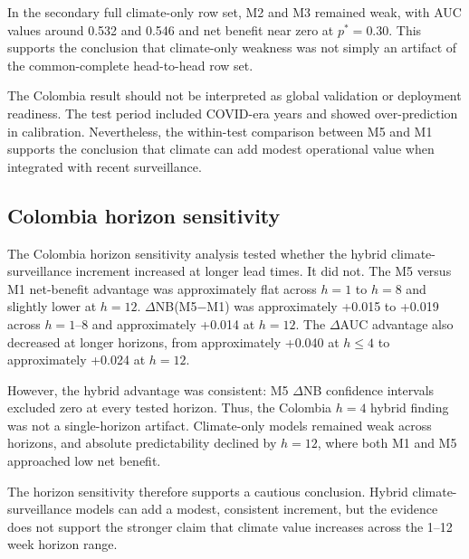\documentclass[11pt,a4paper]{article}
\begin{document}
In the secondary full climate-only row set, M2 and M3 remained weak, with AUC values around 0.532 and 0.546 and net benefit near zero at $p^*=0.30$. This supports the conclusion that climate-only weakness was not simply an artifact of the common-complete head-to-head row set.

The Colombia result should not be interpreted as global validation or deployment readiness. The test period included COVID-era years and showed over-prediction in calibration. Nevertheless, the within-test comparison between M5 and M1 supports the conclusion that climate can add modest operational value when integrated with recent surveillance.


\subsection{Colombia horizon sensitivity}
\label{subsec:colombia-horizon}

The Colombia horizon sensitivity analysis tested whether the hybrid climate-surveillance increment increased at longer lead times. It did not. The M5 versus M1 net-benefit advantage was approximately flat across $h=1$ to $h=8$ and slightly lower at $h=12$. $\Delta$NB(M5$-$M1) was approximately +0.015 to +0.019 across $h=1$--8 and approximately +0.014 at $h=12$. The $\Delta$AUC advantage also decreased at longer horizons, from approximately +0.040 at $h \leq 4$ to approximately +0.024 at $h=12$.

However, the hybrid advantage was consistent: M5 $\Delta$NB confidence intervals excluded zero at every tested horizon. Thus, the Colombia $h=4$ hybrid finding was not a single-horizon artifact. Climate-only models remained weak across horizons, and absolute predictability declined by $h=12$, where both M1 and M5 approached low net benefit.

The horizon sensitivity therefore supports a cautious conclusion. Hybrid climate-surveillance models can add a modest, consistent increment, but the evidence does not support the stronger claim that climate value increases across the 1--12 week horizon range.
\end{document}
